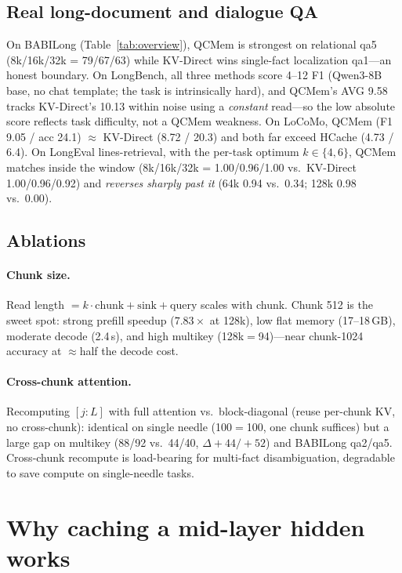 \documentclass[11pt]{article}
\begin{document}


\subsection{Real long-document and dialogue QA}
On BABILong (Table~\ref{tab:overview}), QCMem is strongest on relational qa5
(8k/16k/32k = 79/67/63) while KV-Direct wins single-fact localization qa1---an
honest boundary. On LongBench, all three methods score 4--12 F1 (Qwen3-8B base,
no chat template; the task is intrinsically hard), and QCMem's AVG 9.58 tracks
KV-Direct's 10.13 within noise using a \emph{constant} read---so the low
absolute score reflects task difficulty, not a QCMem weakness. On LoCoMo,
QCMem (F1 9.05 / acc 24.1) $\approx$ KV-Direct (8.72 / 20.3) and both far
exceed HCache (4.73 / 6.4). On LongEval lines-retrieval, with the per-task
optimum $k{\in}\{4,6\}$, QCMem matches inside the window
(8k/16k/32k = 1.00/0.96/1.00 vs.\ KV-Direct 1.00/0.96/0.92) and \emph{reverses
sharply past it} (64k 0.94 vs.\ 0.34; 128k 0.98 vs.\ 0.00).

\subsection{Ablations}
\paragraph{Chunk size.} Read length $=k\cdot\text{chunk}+\text{sink}+\text{query}$
scales with chunk. Chunk 512 is the sweet spot: strong prefill speedup
($7.83\times$ at 128k), low flat memory (17--18\,GB), moderate decode (2.4\,s),
and high multikey (128k$=$94)---near chunk-1024 accuracy at $\approx$half the
decode cost.
\paragraph{Cross-chunk attention.} Recomputing $[j{:}L]$ with full attention
vs.\ block-diagonal (reuse per-chunk KV, no cross-chunk): identical on single
needle (100$=$100, one chunk suffices) but a large gap on multikey
(88/92 vs.\ 44/40, $\Delta{+}44/{+}52$) and BABILong qa2/qa5. Cross-chunk
recompute is load-bearing for multi-fact disambiguation, degradable to save
compute on single-needle tasks.

\section{Why caching a mid-layer hidden works}
\label{sec:mechanism}
\end{document}
